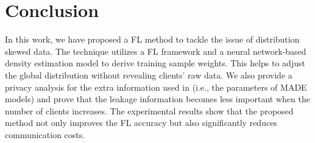 \section{Conclusion}
\label{sec:FedConclusion}
In this work, we have proposed a FL method to tackle the issue of distribution skewed data. The technique utilizes a FL framework and a neural network-based density estimation model to derive training sample weights. This helps to adjust the global distribution without revealing clients' raw data. We also provide a privacy analysis for the extra information used in \MethodnameShort{} (i.e., the parameters of MADE models) and prove that the leakage information becomes less important when the number of clients increases. The experimental results show that the proposed method not only improves the FL accuracy but also significantly reduces communication costs. 
















